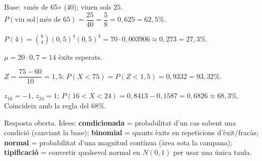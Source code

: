 \begin{solucions}
\begin{sollist}
  \item Base: «més de 65» ($40$); viuen sols $25$.
        $P(\text{viu sol}\,|\,\text{més de 65})=\dfrac{25}{40}=\dfrac{5}{8}=0,625=62,5\%$.
  \item $P(4)=\binom{8}{4}(0,5)^4(0,5)^4=70\cdot 0,003906\approx 0,273=27,3\%$.
  \item $\mu=20\cdot 0,7=14$ èxits esperats.
  \item $Z=\dfrac{75-60}{10}=1,5$; $P(X<75)=P(Z<1,5)=0,9332=93,32\%$.
  \item $z_{16}=-1$, $z_{24}=1$; $P(16<X<24)=0,8413-0,1587=0,6826\approx 68,3\%$.
        Coincideix amb la regla del $68\%$.
  \item Resposta oberta. Idees: \textbf{condicionada} = probabilitat d'un cas sabent una
        condició (canviant la base); \textbf{binomial} = quants èxits en repeticions
        d'èxit/fracàs; \textbf{normal} = probabilitat d'una magnitud contínua (àrea sota
        la campana); \textbf{tipificació} = convertir qualsevol normal en $N(0,1)$ per
        usar una única taula.
\end{sollist}
\end{solucions}
